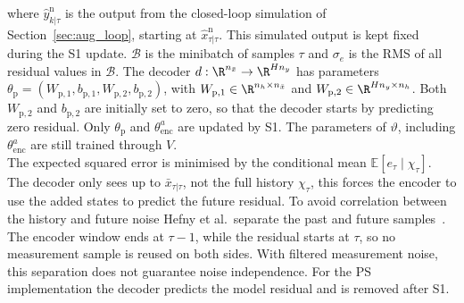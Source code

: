 where $\hat y^{\mathrm n}_{k|\tau}$ is the output from the
closed-loop simulation of Section~\ref{sec:aug_loop},
starting at $\hat x^{\mathrm n}_{\tau|\tau}$.
This simulated output is kept fixed during
the S1 update.
$\mathcal B$ is the minibatch of samples $\tau$ and
$\sigma_e$ is the RMS of all residual values in $\mathcal B$.
The decoder $d:\R^{n_{\bar x}}\to\R^{Hn_y}$ has parameters
$\theta_{\mathrm p}=(W_{\mathrm p,1},b_{\mathrm p,1},
W_{\mathrm p,2},b_{\mathrm p,2})$, with
$W_{\mathrm p,1}\in\R^{n_h\times n_{\bar x}}$ and
$W_{\mathrm p,2}\in\R^{Hn_y\times n_h}$.
Both $W_{\mathrm p,2}$ and $b_{\mathrm p,2}$ are initially
set to zero, so that the decoder starts by predicting zero residual.
Only $\theta_{\mathrm p}$ and $\theta^a_{\mathrm{enc}}$
are updated by S1. 
The parameters of $\vartheta$, including $\theta^a_{\mathrm{enc}}$
are still trained through $V$.
\\
The expected squared error is minimised by
the conditional mean $\mathbb E[e_\tau\mid\chi_\tau]$.
The decoder only sees up to $\bar x_{\tau|\tau}$, not the full history $\chi_\tau$, 
this forces the encoder to use the added states to predict the future residual.
To avoid correlation between the history and future noise Hefny et al.\ separate
the past and future samples~\cite[Sec.~2]{hefny2015supervised}. 
The encoder window ends at $\tau-1$, while the residual starts at $\tau$, so
no measurement sample is reused on both sides.
With filtered measurement noise, this separation does not guarantee noise
independence.
For the PS implementation the decoder predicts the model residual and
is removed after S1.

